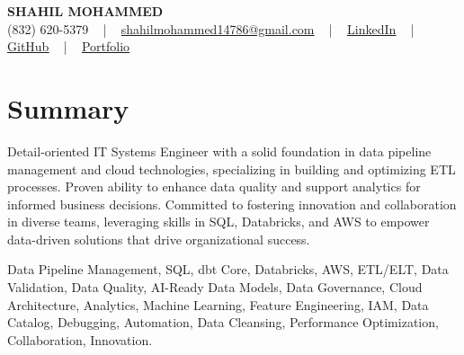 \documentclass[letterpaper,10pt]{article}
\begin{document}
\begin{center}
    {\fontsize{14pt}{12pt}\selectfont \textbf{\MakeUppercase{Shahil Mohammed}}}\\ \vspace{2pt}
    \fontsize{10pt}{12pt}\selectfont (832) 620-5379 ~ | ~ \href{mailto:shahilmohammed14786@gmail.com}{shahilmohammed14786@gmail.com} ~ | ~  
    \href{https://www.linkedin.com/in/shahil-mohammed-9652931a1/}{\color{blue}\underline{LinkedIn}}  ~ | ~ 
    \href{https://github.com/freakbeast14}{\color{blue}\underline{GitHub}} ~ | ~ 
    \href{https://shahil-mohammed.netlify.app/}{\color{blue}\underline{Portfolio}}
    \vspace{-8pt}
\end{center}

\section{Summary}
\vspace{-2pt}\fontsize{8pt}{9pt}\selectfont
Detail-oriented IT Systems Engineer with a solid foundation in data pipeline management and cloud technologies, specializing in building and optimizing ETL processes. Proven ability to enhance data quality and support analytics for informed business decisions. Committed to fostering innovation and collaboration in diverse teams, leveraging skills in SQL, Databricks, and AWS to empower data-driven solutions that drive organizational success. 

{\fontsize{1pt}{1pt}\selectfont\color{white}
Data Pipeline Management, SQL, dbt Core, Databricks, AWS, ETL/ELT, Data Validation, Data Quality, AI-Ready Data Models, Data Governance, Cloud Architecture, Analytics, Machine Learning, Feature Engineering, IAM, Data Catalog, Debugging, Automation, Data Cleansing, Performance Optimization, Collaboration, Innovation.
}
\vspace{-8pt}

\vspace{-2pt}
\end{document}
